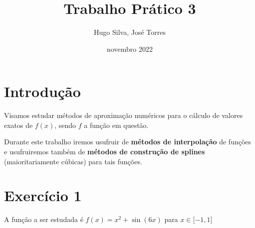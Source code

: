 \documentclass[12pt, letterpaper,fleqn]{article}
\title{Trabalho Prático 3}
\author{Hugo Silva, José Torres}
\date{novembro 2022}
\begin{document}
\maketitle

\section*{Introdução}

Visamos estudar métodos de aproximação numéricos para o cálculo de valores exatos de $f(x)$, sendo $f$ a função em questão.

Durante este trabalho iremos usufruir de \textbf{métodos de interpolação} de funções e usufruiremos também de \textbf{métodos de construção de splines} (maioritariamente cúbicas) para tais funções. 

\section*{Exercício 1}

A função a ser estudada é $f(x) = x^2 + \sin(6x)$ para $x \in \mathopen[-1,1\mathclose]$

\begin{quote}
\centering
\end{quote}
\end{document}

